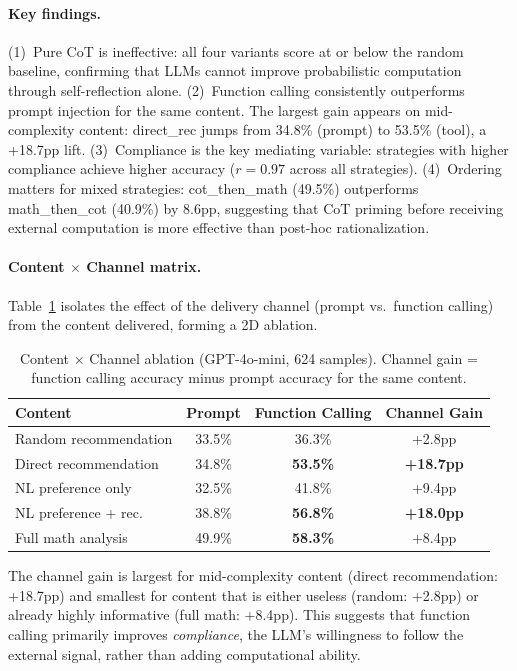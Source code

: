 \documentclass{article}
\begin{document}
\paragraph{Key findings.}
(1)~Pure CoT is ineffective: all four variants score at or below the random baseline, confirming that LLMs cannot improve probabilistic computation through self-reflection alone.
(2)~Function calling consistently outperforms prompt injection for the same content. The largest gain appears on mid-complexity content: direct\_rec jumps from 34.8\% (prompt) to 53.5\% (tool), a +18.7pp lift.
(3)~Compliance is the key mediating variable: strategies with higher compliance achieve higher accuracy ($r = 0.97$ across all strategies).
(4)~Ordering matters for mixed strategies: cot\_then\_math (49.5\%) outperforms math\_then\_cot (40.9\%) by 8.6pp, suggesting that CoT priming before receiving external computation is more effective than post-hoc rationalization.

\paragraph{Content $\times$ Channel matrix.}
Table~\ref{tab:content_channel} isolates the effect of the delivery channel (prompt vs.\ function calling) from the content delivered, forming a 2D ablation.

\begin{table}[ht]
\centering
\small
\caption{Content $\times$ Channel ablation (GPT-4o-mini, 624 samples). Channel gain = function calling accuracy minus prompt accuracy for the same content.}
\label{tab:content_channel}
\begin{tabular}{@{}lccc@{}}
\toprule
Content & Prompt & Function Calling & Channel Gain \\
\midrule
Random recommendation & 33.5\% & 36.3\% & +2.8pp \\
Direct recommendation & 34.8\% & \textbf{53.5\%} & \textbf{+18.7pp} \\
NL preference only & 32.5\% & 41.8\% & +9.4pp \\
NL preference + rec. & 38.8\% & \textbf{56.8\%} & \textbf{+18.0pp} \\
Full math analysis & 49.9\% & \textbf{58.3\%} & +8.4pp \\
\bottomrule
\end{tabular}
\end{table}

The channel gain is largest for mid-complexity content (direct recommendation: +18.7pp) and smallest for content that is either useless (random: +2.8pp) or already highly informative (full math: +8.4pp).
This suggests that function calling primarily improves \emph{compliance}, the LLM's willingness to follow the external signal, rather than adding computational ability.
\end{document}
